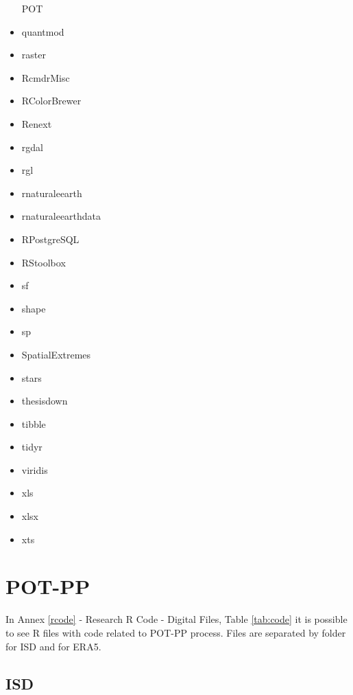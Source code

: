\documentclass[12pt,oneside]{reedthesis}
\begin{document}
\begin{itemize}
  POT
\item
  quantmod
\item
  raster
\item
  RcmdrMisc
\item
  RColorBrewer
\item
  Renext
\item
  rgdal
\item
  rgl
\item
  rnaturaleearth
\item
  rnaturaleearthdata
\item
  RPostgreSQL
\item
  RStoolbox
\item
  sf
\item
  shape
\item
  sp
\item
  SpatialExtremes
\item
  stars
\item
  thesisdown
\item
  tibble
\item
  tidyr
\item
  viridis
\item
  xls
\item
  xlsx
\item
  xts
\end{itemize}
\hypertarget{pot-pp-1}{%
\section{POT-PP}\label{pot-pp-1}}

In Annex \ref{rcode} - Research R Code - Digital Files, Table \ref{tab:code} it is possible to see R files with code related to POT-PP process. Files are separated by folder for ISD and for ERA5.

\hypertarget{isd-1}{%
\subsection{ISD}\label{isd-1}}
\end{document}
